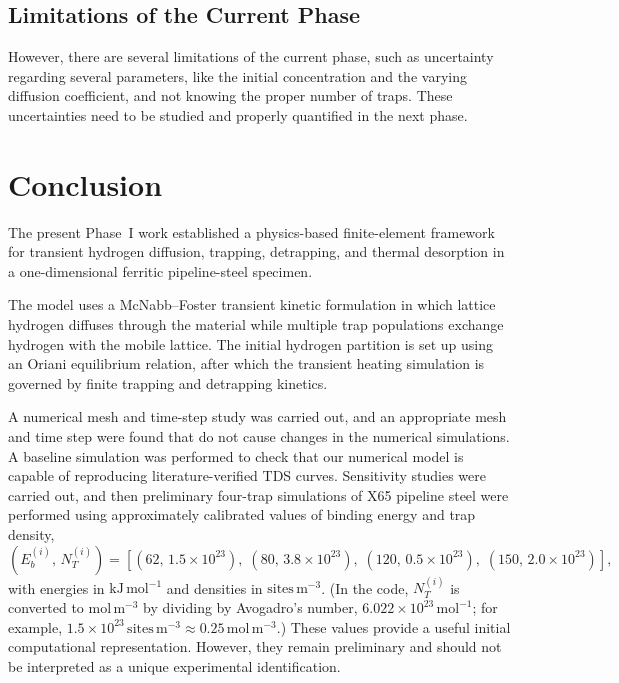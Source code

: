 \documentclass[a4paper,12pt,oneside]{report}
\begin{document}
\section{Limitations of the Current Phase}
\label{sec:limitations}
 
However, there are several limitations of the current phase, such as uncertainty
regarding several parameters, like the initial concentration and the varying
diffusion coefficient, and not knowing the proper number of traps. These
uncertainties need to be studied and properly quantified in the next phase.
 
 
\chapter{Conclusion}
\label{ch:conclusion}
 
The present Phase~I work established a physics-based finite-element framework for
transient hydrogen diffusion, trapping, detrapping, and thermal desorption in a
one-dimensional ferritic pipeline-steel specimen.
 
The model uses a McNabb--Foster transient kinetic formulation in which lattice
hydrogen diffuses through the material while multiple trap populations exchange
hydrogen with the mobile lattice. The initial hydrogen partition is set up using
an Oriani equilibrium relation, after which the transient heating simulation is
governed by finite trapping and detrapping kinetics.
 
A numerical mesh and time-step study was carried out, and an appropriate mesh and
time step were found that do not cause changes in the numerical simulations. A
baseline simulation was performed to check that our numerical model is capable of
reproducing literature-verified TDS curves. Sensitivity studies were carried out,
and then preliminary four-trap simulations of X65 pipeline steel were performed using
approximately calibrated values of binding energy and trap density,
\begin{equation}
  \left(E_b^{(i)},\, N_T^{(i)}\right) =
  \left[ (62,\, 1.5\times10^{23}),\; (80,\, 3.8\times10^{23}),\;
         (120,\, 0.5\times10^{23}),\; (150,\, 2.0\times10^{23}) \right],
  \label{eq:fourtrap}
\end{equation}
with energies in $\mathrm{kJ\,mol^{-1}}$ and densities in $\mathrm{sites\,m^{-3}}$.
(In the code, $N_T^{(i)}$ is converted to $\mathrm{mol\,m^{-3}}$ by dividing by
Avogadro's number, $6.022\times10^{23}\,\mathrm{mol^{-1}}$; for example,
$1.5\times10^{23}\,\mathrm{sites\,m^{-3}}\approx 0.25\,\mathrm{mol\,m^{-3}}$.)
These values provide a useful initial computational representation. However, they
remain preliminary and should not be interpreted as a unique experimental
identification.
 
\end{document}
